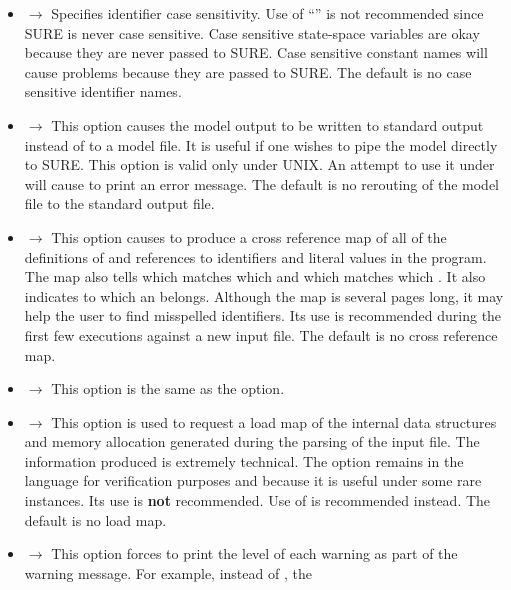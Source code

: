 \begin{footnotesize}\begin{itemize}
\item {} $\longrightarrow$ Specifies identifier case sensitivity.
      Use of ``'' is not recommended since SURE is never case 
      sensitive.  Case sensitive state-space variables are okay because they
      are never passed
      to SURE.  Case sensitive constant names will cause problems because they
      are passed to SURE.
      The default is no case sensitive identifier names.
\item {} $\longrightarrow$ This option causes the model output to be
      written to standard output instead of to a model file.   It is useful
      if one wishes to pipe the model directly to SURE.   This option is valid
      only under UNIX.   An attempt to use it under 
      will cause  to print an error message.
      The default is no rerouting of the model file to the standard output file.
\item {} $\longrightarrow$
      This option causes  to produce a cross
      reference map of all of the
      definitions of and references to identifiers and literal values in the
      program.   The map also tells which  matches which 
      and which  matches which .   It also indicates to which
       an  belongs.
      Although the map is several pages long, it may help the user to find
      misspelled identifiers.   Its use is recommended during the first few
      executions
      against a new input file.
      The default is no cross reference map.
\item {} $\longrightarrow$
      This option is the same as the  option.
\item {} $\longrightarrow$
      This option is used to request a load map of the internal data structures
      and memory allocation generated during the parsing of the input file.
      The information produced is extremely technical.   The option remains in
      the language for verification purposes and because it is useful under
      some rare instances.   Its use is {\bf not}
      recommended.   Use of  is recommended instead.
      The default is no load map.
\item {} $\longrightarrow$
      This option forces  to print the level of each
      warning as part of
      the warning message.   For example, instead of \word{[WARNING]}, the

\end{itemize}
\end{footnotesize}
